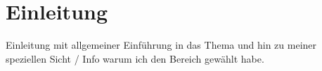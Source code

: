 \section{Einleitung}

\TODO

Einleitung mit allgemeiner Einführung in das Thema und hin zu meiner speziellen Sicht / Info warum ich den Bereich gewählt habe.

\pagebreak